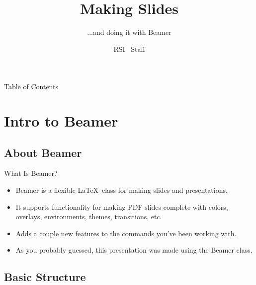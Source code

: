 \documentclass[pdf]{beamer}
\title{Making Slides}
\subtitle{...and doing it with Beamer}
\author{RSI \the\year\ Staff}
\begin{document}

\begin{frame}
	\thispagestyle{empty}
	\titlepage
\end{frame}
\addtocounter{framenumber}{-1}

\begin{frame}{Table of Contents}
	\tableofcontents
\end{frame}

\section{Intro to Beamer}

\subsection{About Beamer}

\begin{frame}{What Is Beamer?}
	\begin{itemize}
		\item Beamer is a flexible \LaTeX\ class for making slides and presentations.
		\item It supports functionality for making PDF slides complete with colors, overlays, environments, themes, transitions, etc.
		\item Adds a couple new features to the commands you've been working with.
		\pause
		\item As you probably guessed, this presentation was made using the Beamer class.
	\end{itemize}
\end{frame}

\subsection[Basic Structure]{Basic Structure}
\end{document}
